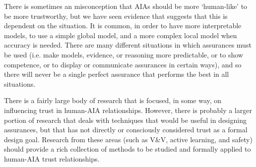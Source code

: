    There is sometimes an misconception that AIAs should be more `human-like' to be more trustworthy, but we have seen evidence that suggests that this is dependent on the situation. It is common, in order to have more interpretable models, to use a simple global model, and a more complex local model when accuracy is needed. There are many different situations in which assurances must be used (i.e. make models, evidence, or reasoning more predictable, or to show competence, or to display or communicate assurances in certain ways), and so there will never be a single perfect assurance that performs the best in all situations.

    

    There is a fairly large body of research that is focused, in some way, on influencing trust in human-AIA relationships. However, there is probably a larger portion of research that deals with techniques that would be useful in designing assurances, but that has not directly or consciously considered trust as a formal design goal. Research from these areas (such as V\&V, active learning, and safety) should provide a rich collection of methods to be studied and formally applied to human-AIA trust relationships.

\newpage

